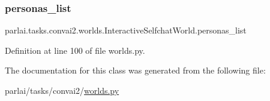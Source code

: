 \subsubsection{\texorpdfstring{personas\+\_\+list}{personas\_list}}
{\footnotesize\ttfamily parlai.\+tasks.\+convai2.\+worlds.\+Interactive\+Selfchat\+World.\+personas\+\_\+list}



Definition at line 100 of file worlds.\+py.



The documentation for this class was generated from the following file\+:\begin{DoxyCompactItemize}
\item 
parlai/tasks/convai2/\hyperlink{parlai_2tasks_2convai2_2worlds_8py}{worlds.\+py}\end{DoxyCompactItemize}

